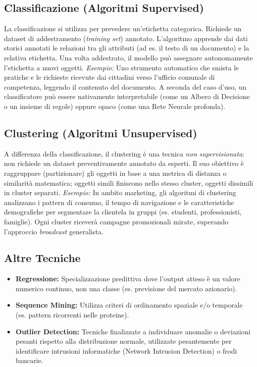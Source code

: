 \subsection{Classificazione (Algoritmi Supervised)}
La classificazione si utilizza per prevedere un'etichetta categorica. Richiede un dataset di addestramento (\textit{training set}) annotato. 
L'algoritmo apprende dai dati storici annotati le relazioni tra gli attributi (ad es. il testo di un documento) e la relativa etichetta. Una volta addestrato, il modello può assegnare autonomamente l'etichetta a nuovi oggetti.
\textit{Esempio:} Uno strumento automatico che smista le pratiche e le richieste ricevute dai cittadini verso l'ufficio comunale di competenza, leggendo il contenuto del documento.
A seconda del caso d'uso, un classificatore può essere nativamente interpretabile (come un Albero di Decisione o un insieme di regole) oppure opaco (come una Rete Neurale profonda).

\subsection{Clustering (Algoritmi Unsupervised)}
A differenza della classificazione, il clustering è una tecnica \textit{non supervisionata}: non richiede un dataset preventivamente annotato da esperti. Il suo obiettivo è raggruppare (partizionare) gli oggetti in base a una metrica di distanza o similarità matematica; oggetti simili finiscono nello stesso cluster, oggetti dissimili in cluster separati.
\textit{Esempio:} In ambito marketing, gli algoritmi di clustering analizzano i pattern di consumo, il tempo di navigazione e le caratteristiche demografiche per segmentare la clientela in gruppi (es. studenti, professionisti, famiglie). Ogni cluster riceverà campagne promozionali mirate, superando l'approccio \textit{broadcast} generalista.

\subsection{Altre Tecniche}
\begin{itemize}
    \item \textbf{Regressione:} Specializzazione predittiva dove l'output atteso è un valore numerico continuo, non una classe (es. previsione del mercato azionario).
    \item \textbf{Sequence Mining:} Utilizza criteri di ordinamento spaziale e/o temporale (es. pattern ricorrenti nelle proteine).
    \item \textbf{Outlier Detection:} Tecniche finalizzate a individuare anomalie o deviazioni pesanti rispetto alla distribuzione normale, utilizzate pesantemente per identificare intrusioni informatiche (Network Intrusion Detection) o frodi bancarie.
\end{itemize}

